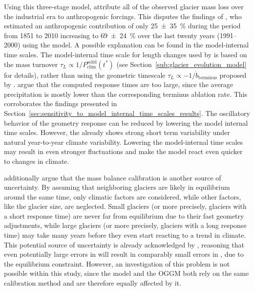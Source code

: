     Using this three-stage model, \citet{Roe2020} attribute all of the observed glacier mass loss over the industrial era to anthropogenic forcings. This disputes the findings of \citet{Marzeion2014a}, who estimated an anthropogenic contribution of only \SI{25\pm35}{\percent} during the period from 1851 to 2010 increasing to \SI{69\pm24}{\percent} over the last twenty years (1991--2000) using the \vas{} model. A possible explanation can be found in the model-internal time scales. The model-internal time scale for length changes used by \citet{Marzeion2012b} is based on the mass turnover $\tau_L \propto 1/P^\text{solid}_\text{clim}(t^*)$ (see Section~\ref{sub:glacier_evolution_model} for details), rather than using the geometric timescale $\tau_L \propto -1/\dot{b}_\text{terminus}$ proposed by \citet{Johannesson1989}. \citet{Roe2020} argue that the computed response times are too large, since the average precipitation is mostly lower than the corresponding terminus ablation rate. This corroborates the findings presented in Section~\ref{sec:sensitivity_to_model_internal_time_scales_results}. The oscillatory behavior of the geometry response can be reduced by lowering the model internal time scales. However, the \vas{} already shows strong short term variability under natural year-to-year climate variability. Lowering the model-internal time scales may result in even stronger fluctuations and make the model react even quicker to changes in climate.

    \citet{Roe2020} additionally argue that the mass balance calibration is another source of uncertainty. By assuming that neighboring glaciers are likely in equilibrium around the same time, only climatic factors are considered, while other factors, like the glacier size, are neglected. Small glaciers (or more precisely, glaciers with a short response time) are never far from equilibrium due to their fast geometry adjustments, while large glaciers (or more precisely, glaciers with a long response time) may take many years before they even start reacting to a trend in climate. This potential source of uncertainty is already acknowledged by \citet{Maussion2019}, reasoning that even potentially large errors in \tstar{} will result in comparably small errors in \mustar{}, due to the equilibrium constraint. However, an investigation of this problem is not possible within this study, since the \vas{} model and the OGGM both rely on the same calibration method and are therefore equally affected by it.
    
